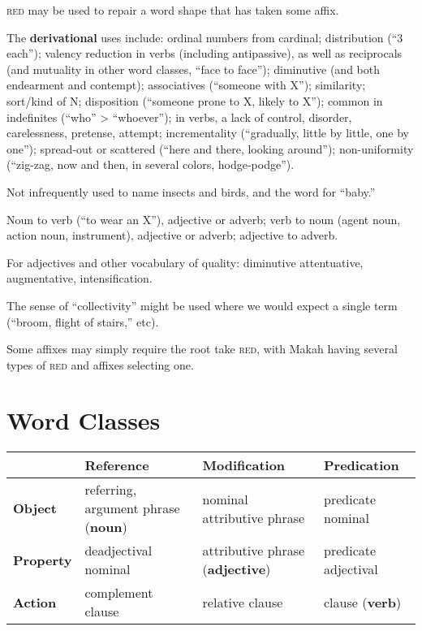 \documentclass[11pt]{article}
\newcommand{\LL}[1]{\textbf{#1}}  %
\newcommand{\I}[1]{\textsc{#1}}   %
\begin{document}
\I{red} may be used to repair a word shape that has taken some affix.

The \textbf{derivational} uses include: ordinal numbers from cardinal;
distribution (``3 each''); valency reduction in verbs (including
antipassive), as well as reciprocals (and mutuality in other word
classes, ``face to face''); diminutive (and both endearment and
contempt); associatives (``someone with X''); similarity; sort/kind of
N; disposition (``someone prone to X, likely to X''); common in
indefinites (``who'' > ``whoever''); in verbs, a lack of control,
disorder, carelessness, pretense, attempt; incrementality
(``gradually, little by little, one by one''); spread-out or scattered
(``here and there, looking around''); non-uniformity (``zig-zag, now
and then, in several colors, hodge-podge'').

Not infrequently used to name insects and birds, and the word for
``baby.'' 

Noun to verb (``to wear an X''), adjective or adverb; verb to noun
(agent noun, action noun, instrument), adjective or adverb; adjective
to adverb.

For adjectives and other vocabulary of quality: diminutive
attentuative, augmentative, intensification.

The sense of ``collectivity'' might be used where we would expect a
single term (``broom, flight of stairs,'' etc).

Some affixes may simply require the root take \I{red}, with Makah
having several types of \I{red} and affixes selecting one.


\section{Word Classes}

\begin{center}
  \small
  \begin{tabular}{|l|l|l|l|}
    \hline
    & \LL{Reference} & \LL{Modification} & \LL{Predication} \\
    \hline
\LL{Object} & referring, argument phrase (\LL{noun}) & nominal attributive phrase &
                                                                   predicate
                                                                   nominal \\
    \hline
\LL{Property} & deadjectival nominal & attributive phrase (\LL{adjective}) & predicate adjectival\\
    \hline
\LL{Action} & complement clause & relative clause & clause (\LL{verb})\\
    \hline
  \end{tabular}
\end{center}
\end{document}
